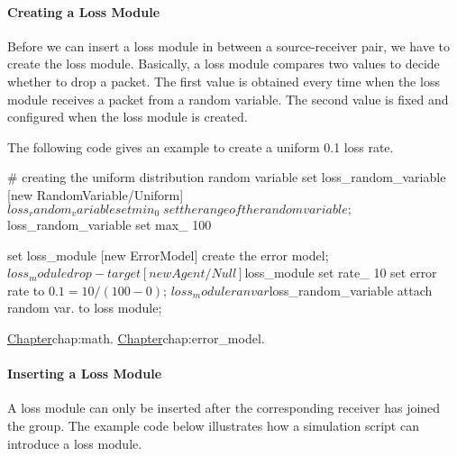 
\paragraph{Creating a Loss Module}
Before we can insert a loss module in between a source-receiver pair,
we have to create the loss module.  Basically,
a loss module compares two values to decide whether to drop a packet.
The first value is obtained every time when the loss module receives 
a packet from a random variable.  The second value
is fixed and configured when the loss module is created.

The following code gives an example to create a uniform 0.1 loss rate.
\begin{program}
        # {\cf creating the uniform distribution random variable}
        set loss_random_variable [new RandomVariable/Uniform] 
        $loss_random_variable set min_ 0 \; set the range of the random variable;
        $loss_random_variable set max_ 100

        set loss_module [new ErrorModel] \; create the error model;
        $loss_module drop-target [new Agent/Null] 
        $loss_module set rate_ 10 \; set error rate to \(0.1 = 10 / (100 - 0)\);
        $loss_module ranvar $loss_random_variable \; attach random var. to loss module;
\end{program}
\href{A catalogue of the random variable distributions was described earlier}{%
	Chapter}{chap:math}.
\href{A more detailed discussion of error models was also described earlier
in a different chapter}{Chapter}{chap:error_model}.

\paragraph{Inserting a Loss Module}
A loss module can only be inserted after the corresponding receiver
has joined the group.  The example code below illustrates how
a simulation script can introduce a loss module.


